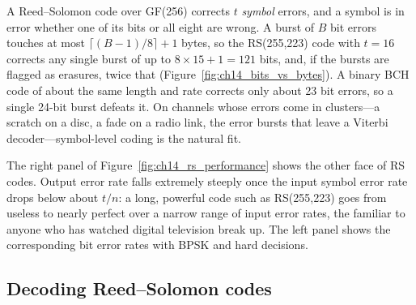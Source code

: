 A Reed--Solomon code over GF(256) corrects $t$ \emph{symbol} errors, and a symbol is in error
whether one of its bits or all eight are wrong. A burst of $B$ bit errors touches at most
$\lceil(B-1)/8\rceil+1$ bytes, so the RS(255,223) code with $t=16$ corrects any single burst of up
to $8\times15+1=121$ bits, and, if the bursts are flagged as erasures, twice that
(Figure~\ref{fig:ch14_bits_vs_bytes}). A binary BCH code of about the same length and rate corrects
only about 23 bit errors, so a single 24-bit burst defeats it. On channels whose errors come in
clusters---a scratch on a disc, a fade on a radio link, the error bursts that leave a Viterbi
decoder---symbol-level coding is the natural fit.


The right panel of Figure~\ref{fig:ch14_rs_performance} shows the other face of RS codes. Output
error rate falls extremely steeply once the input symbol error rate drops below about $t/n$: a
long, powerful code such as RS(255,223) goes from useless to nearly perfect over a narrow range
of input error rates, the  familiar to anyone who has watched digital
television break up. The left panel shows the corresponding bit error rates with BPSK and hard
decisions.

\subsection{Decoding Reed--Solomon codes}

